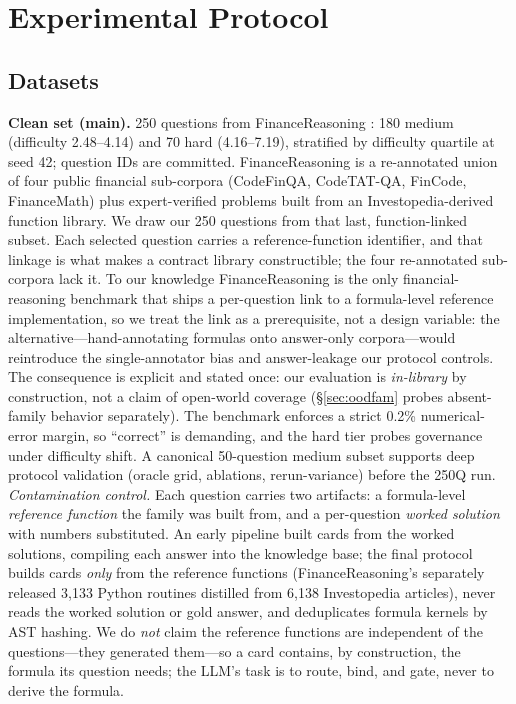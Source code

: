 \section{Experimental Protocol}\label{sec:protocol}

\subsection{Datasets}
\textbf{Clean set (main).} 250 questions from FinanceReasoning \cite{tang2025financereasoning}: 180 medium (difficulty 2.48--4.14) and 70 hard (4.16--7.19), stratified by difficulty quartile at seed 42; question IDs are committed.
FinanceReasoning is a re-annotated union of four public financial sub-corpora (CodeFinQA, CodeTAT-QA, FinCode, FinanceMath) plus expert-verified problems built from an Investopedia-derived function library.
We draw our 250 questions from that last, function-linked subset.
Each selected question carries a reference-function identifier, and that linkage is what makes a contract library constructible; the four re-annotated sub-corpora lack it.
To our knowledge FinanceReasoning is the only financial-reasoning benchmark that ships a per-question link to a formula-level reference implementation, so we treat the link as a prerequisite, not a design variable: the alternative---hand-annotating formulas onto answer-only corpora---would reintroduce the single-annotator bias and answer-leakage our protocol controls.
The consequence is explicit and stated once: our evaluation is \emph{in-library} by construction, not a claim of open-world coverage (\S\ref{sec:oodfam} probes absent-family behavior separately).
The benchmark enforces a strict 0.2\% numerical-error margin, so ``correct'' is demanding, and the hard tier probes governance under difficulty shift.
A canonical 50-question medium subset supports deep protocol validation (oracle grid, ablations, rerun-variance) before the 250Q run.
\emph{Contamination control.}
Each question carries two artifacts: a formula-level \emph{reference function} the family was built from, and a per-question \emph{worked solution} with numbers substituted.
An early pipeline built cards from the worked solutions, compiling each answer into the knowledge base; the final protocol builds cards \emph{only} from the reference functions (FinanceReasoning's separately released 3{,}133 Python routines distilled from 6{,}138 Investopedia articles), never reads the worked solution or gold answer, and deduplicates formula kernels by AST hashing.
We do \emph{not} claim the reference functions are independent of the questions---they generated them---so a card contains, by construction, the formula its question needs; the LLM's task is to route, bind, and gate, never to derive the formula.
